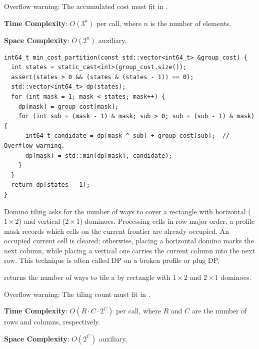 Overflow warning: The accumulated cost must fit in .

\textbf{Time Complexity}: $O(3^{n})$ per call, where $n$ is the number of elements.

\textbf{Space Complexity}: $O(2^{n})$ auxiliary.

\begin{lstlisting}[style=cpp]
int64_t min_cost_partition(const std::vector<int64_t> &group_cost) {
  int states = static_cast<int>(group_cost.size());
  assert(states > 0 && (states & (states - 1)) == 0);
  std::vector<int64_t> dp(states);
  for (int mask = 1; mask < states; mask++) {
    dp[mask] = group_cost[mask];
    for (int sub = (mask - 1) & mask; sub > 0; sub = (sub - 1) & mask) {
      int64_t candidate = dp[mask ^ sub] + group_cost[sub];  // Overflow warning.
      dp[mask] = std::min(dp[mask], candidate);
    }
  }
  return dp[states - 1];
}
\end{lstlisting}
Domino tiling asks for the number of ways to cover a rectangle with horizontal ($1 \times 2$) and vertical ($2 \times 1$) dominoes. Processing cells in row-major order, a profile mask records which cells on the current frontier are already occupied. An occupied current cell is cleared; otherwise, placing a horizontal domino marks the next column, while placing a vertical one carries the current column into the next row. This technique is often called DP on a broken profile or plug DP.

\begin{compactitem}
  \item {} returns the number of ways to tile a  by  rectangle with $1 \times 2$ and $2 \times 1$ dominoes.
\end{compactitem}

Overflow warning: The tiling count must fit in .

\textbf{Time Complexity}: $O(R \cdot C \cdot 2^{C})$ per call, where $R$ and $C$ are the number of rows and columns, respectively.

\textbf{Space Complexity}: $O(2^{C})$ auxiliary.

